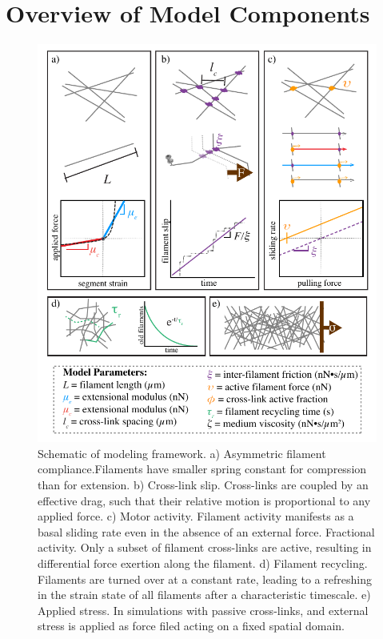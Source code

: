 

\section{Overview of Model Components}

\begin{figure}[h!]
\centering
\includegraphics[width=\hsize]{model/figures/fig2/fig2}
\caption{\label{fig:sim} Schematic of modeling framework. a) Asymmetric filament compliance.Filaments have smaller spring constant for compression than for extension. b) Cross-link slip. Cross-links are coupled by an effective drag, such that their relative motion is
proportional to any applied force. c) Motor activity. Filament activity manifests as a basal sliding rate even in the absence of an external force. Fractional activity. Only a subset of filament cross-links are active, resulting in differential force exertion along the filament. d) Filament recycling. Filaments are turned over at a constant rate, leading to a refreshing in the strain state of all filaments after a characteristic timescale. e) Applied stress. In simulations with passive cross-links, and external stress is applied as force filed acting on a fixed spatial domain.}
\end{figure}

